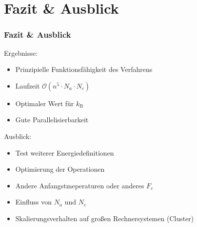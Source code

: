 \section{Fazit \& Ausblick}
\begin{frame}
  \frametitle{Fazit \& Ausblick}
  Ergebnisse:
  \begin{itemize}
    \item Prinzipielle Funktionsfähigkeit des Verfahrens
    \item Laufzeit $\mathcal{O}\left(n^5\cdot N_a\cdot N_c\right)$
    \item Optimaler Wert für $k_\mathrm{B}$
    \item Gute Parallelisierbarkeit
  \end{itemize}
  \pause{}
  Ausblick:
  \begin{itemize}
    \item Test weiterer Energiedefinitionen
    \item Optimierung der Operationen
    \item Andere Anfangstmeperaturen oder anderes $F_c$
    \item Einfluss von $N_a$ und $N_c$
    \item Skalierungsverhalten auf großen Rechnersystemen (Cluster)
  \end{itemize}
\end{frame}
